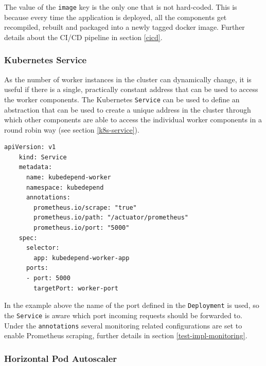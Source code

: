 The value of the \texttt{image} key is the only one that is not hard-coded. This is because every time the application is deployed, all the components get recompiled, rebuilt and packaged into a newly tagged docker image. Further details about the CI/CD pipeline in section \ref{cicd}.

\subsubsection{Kubernetes Service}

As the number of worker instances in the cluster can dynamically change, it is useful if there is a single, practically constant address that can be used to access the worker components. The Kubernetes \texttt{Service} can be used to define an abstraction that can be used to create a unique address in the cluster through which other components are able to access the individual worker components in a round robin way (see section \ref{k8s-service}).

\vspace{0.5cm}
\begin{minipage}{\linewidth}
	\begin{lstlisting}[caption={Worker \texttt{Service}}]
	apiVersion: v1
	kind: Service
	metadata:
	  name: kubedepend-worker
	  namespace: kubedepend
	  annotations:
	    prometheus.io/scrape: "true"
	    prometheus.io/path: "/actuator/prometheus"
	    prometheus.io/port: "5000"
	spec:
	  selector:
	    app: kubedepend-worker-app
	  ports:
	  - port: 5000
	    targetPort: worker-port\end{lstlisting}
\end{minipage}

In the example above the name of the port defined in the \texttt{Deployment} is used, so the \texttt{Service} is aware which port incoming requests should be forwarded to. Under the \texttt{annotations} several monitoring related configurations are set to enable Prometheus scraping, further details in section \ref{test-impl-monitoring}.


\subsubsection{Horizontal Pod Autoscaler} \label{impl-hpa}


